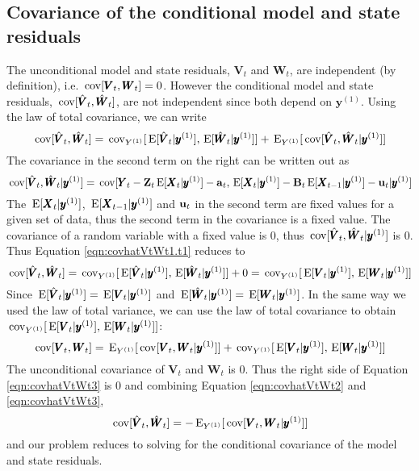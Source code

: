 \documentclass[]{article}
\def\UPS{\mbox{\boldmath $\Upsilon$}}
\def\XI{\mbox{\boldmath $\Xi$}}
\def\BB{\mbox{$\mathbf B$}}	\def\bb{\mbox{$\mathbf b$}} \def\Bb{\mbox{$\mathbf J$}} \def\Ba{\mbox{$\mathbf L$}} \def\Bm{\UPS}
\def\E{\,\textup{\textrm{E}}}
\def\VV{\mbox{$\pmb{V}$}}	\def\vv{\mbox{$\pmb{v}$}}
\def\WW{\mbox{$\pmb{W}$}}	\def\ww{\mbox{$\pmb{w}$}}
\def\XX{\mbox{$\pmb{X}$}}	\def\xx{\mbox{$\pmb{x}$}}
\def\YY{\mbox{$\pmb{Y}$}}	\def\yy{\mbox{$\pmb{y}$}}
\def\ZZ{\mbox{$\mathbf Z$}}	\def\zz{\mbox{$\mathbf z$}}	\def\Zb{\mbox{$\mathbf M$}} \def\Za{\mbox{$\mathbf N$}} \def\Zm{\XI}
\def\cov{\,\textup{\textrm{cov}}}
\begin{document}
\subsection{Covariance of the conditional model and state residuals}
The unconditional model and state residuals, $\VV_t$ and $\WW_t$, are independent (by definition), i.e. $\cov[\VV_t,\WW_t]=0$.  However the conditional model and state residuals, $\cov[\hat{\VV}_t,\hat{\WW}_t]$, are not independent since both depend on $\yy^{(1)}$.  
Using the law of total covariance, we can write
\begin{equation}\label{eqn:covhatVtWt1.t1}
\cov[\hat{\VV}_t,\hat{\WW}_t] = 
\cov_{Y^{(1)}}[\E[\hat{\VV}_t|\yy^{(1)}],\E[\hat{\WW}_t|\yy^{(1)}]] + \E_{Y^{(1)}}[\cov[\hat{\VV}_t, \hat{\WW}_t|\yy^{(1)}]]
\end{equation}
The covariance in the second term on the right can be written out as
\begin{equation}
\cov[\hat{\VV}_t, \hat{\WW}_t|\yy^{(1)}] =  \cov[\YY_t-\ZZ_t\E[\XX_t|\yy^{(1)}]-\aa_t, \E[\XX_{t}|\yy^{(1)}]-\BB_t\E[\XX_{t-1}|\yy^{(1)}]-\uu_t|\yy^{(1)}]
\end{equation}
The $\E[\XX_t|\yy^{(1)}]$, $\E[\XX_{t-1}|\yy^{(1)}]$ and $\mbox{$\mathbf u$}_t$ in the second term are fixed values for a given set of data, thus the second term in the covariance is a fixed value. The covariance of a random variable with a fixed value is 0, thus $\cov[\hat{\VV}_t, \hat{\WW}_t|\yy^{(1)}]$ is 0.  Thus Equation \ref{eqn:covhatVtWt1.t1} reduces to
\begin{equation}\label{eqn:covhatVtWt2.t1}
\cov[\hat{\VV}_t,\hat{\WW}_t] = \cov_{Y^{(1)}}[\E[\hat{\VV}_t|\yy^{(1)}],\E[\hat{\WW}_t|\yy^{(1)}]] + 0 = \cov_{Y^{(1)}}[\E[\VV_t|\yy^{(1)}],\E[\WW_t|\yy^{(1)}]]
\end{equation}
Since $\E[\hat{\VV}_t|\yy^{(1)}]=\E[\VV_t|\yy^{(1)}]$ and $\E[\hat{\WW}_t|\yy^{(1)}]=\E[\WW_t|\yy^{(1)}]$.
In the same way we used the law of total variance, we can use the law of total covariance  to obtain $\cov_{Y^{(1)}}[\E[\VV_t|\yy^{(1)}],\E[\WW_t|\yy^{(1)}]]$:
\begin{equation}\label{eqn:covhatVtWt3.t1}
\cov[\VV_t, \WW_t] = \E_{Y^{(1)}}[\cov[\VV_t, \WW_t|\yy^{(1)}]] + \cov_{Y^{(1)}}[\E[\VV_t|\yy^{(1)}],\E[\WW_t|\yy^{(1)}]]\\ 
\end{equation}
The unconditional covariance of $\VV_t$ and $\WW_t$ is 0. Thus the right side of Equation \ref{eqn:covhatVtWt3} is 0 and combining Equation \ref{eqn:covhatVtWt2} and \ref{eqn:covhatVtWt3},
\begin{equation}\label{eqn:conditionalcovvtwt.t1}
\cov[\hat{\VV}_t,\hat{\WW}_t] = - \E_{Y^{(1)}}[ \cov[\VV_t, \WW_t|\yy^{(1)}] ] 
\end{equation}
and our problem reduces to solving for the conditional covariance of the model and state residuals.  
\end{document}
